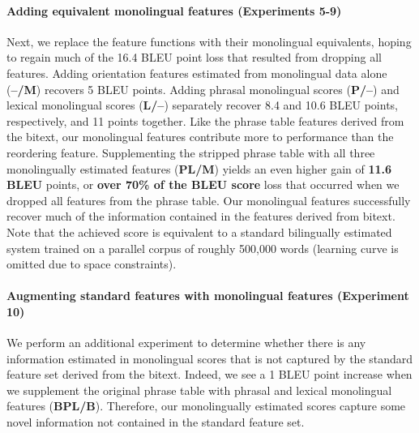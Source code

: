\documentclass[11pt]{article}
\begin{document}
\paragraph{Adding equivalent monolingual features (Experiments 5-9)}

Next, we replace the feature functions with their monolingual equivalents, hoping to regain much of the 16.4 BLEU point loss that resulted from dropping all features.  Adding orientation features estimated from monolingual data alone ({\bf --/M})  recovers 5 BLEU points. Adding phrasal monolingual scores ({\bf P/--}) and lexical monolingual scores ({\bf L/--}) separately recover 8.4 and 10.6 BLEU points, respectively, and 11 points together. Like the phrase table features derived from the bitext, our monolingual features contribute more to performance than the reordering feature. Supplementing the stripped phrase table with all three monolingually estimated features ({\bf PL/M}) yields an even higher gain of {\bf 11.6 BLEU} points, or {\bf over 70\% of the BLEU score} loss that occurred when we dropped all features from the phrase table. Our monolingual features successfully recover much of the information contained in the features derived from bitext.  Note that the achieved score is equivalent to a standard bilingually estimated system trained on a parallel corpus of roughly 500,000 words (learning curve is omitted due to space constraints).

\paragraph{Augmenting standard features with monolingual features (Experiment 10)}
We perform an additional experiment to determine whether there is any information estimated in monolingual scores that is not captured by the standard feature set derived from the bitext. Indeed, we see a 1 BLEU point increase when we supplement the original phrase table with phrasal and lexical monolingual features ({\bf BPL/B}). Therefore, our monolingually estimated scores capture some novel information not contained in the standard feature set.


\end{document}
